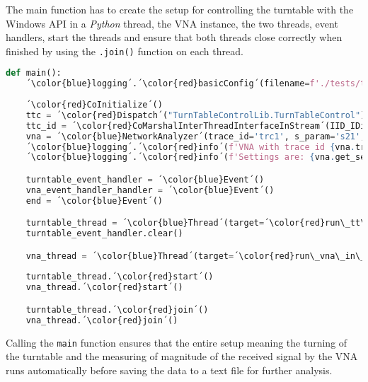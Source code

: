 The main function has to create the setup for controlling the turntable with the Windows API in a \textit{Python} thread, the VNA instance, the two threads, event handlers, start the threads and ensure that both threads close correctly when finished by using the \verb+.join()+ function on each thread. 
\begin{lstlisting}[language=Python, caption=Main function.]
def main():
    ´\color{blue}logging´.´\color{red}basicConfig´(filename=f'./tests/test-{time.strftime("%Y%m%d-%H%M")}-log.txt', filemode='a', format="%(asctime)s:%(name)s: %(message)s", level=logging.INFO, datefmt="%Y-%m-%d %H:%M:%S")
    
    ´\color{red}CoInitialize´()
    ttc = ´\color{red}Dispatch´("TurnTableControlLib.TurnTableControl")
    ttc_id = ´\color{red}CoMarshalInterThreadInterfaceInStream´(IID_IDispatch, ttc)
    vna = ´\color{blue}NetworkAnalyzer´(trace_id='trc1', s_param='s21', freq=5.65)
    ´\color{blue}logging´.´\color{red}info´(f'VNA with trace id {vna.trace_id} is created. Measuring {vna.s_param}.')
    ´\color{blue}logging´.´\color{red}info´(f'Settings are: {vna.get_settings()}')

    turntable_event_handler = ´\color{blue}Event´()
    vna_event_handler_handler = ´\color{blue}Event´()
    end = ´\color{blue}Event´()

    turntable_thread = ´\color{blue}Thread´(target=´\color{red}run\_tt\_in\_thread´, kwargs={'ttc_id': ttc_id, 'ttc': ttc, 'turntable_event_handler': turntable_event_handler, 'vna_event_handler': vna_event_handler_handler, 'end': end})
    turntable_event_handler.clear()

    vna_thread = ´\color{blue}Thread´(target=´\color{red}run\_vna\_in\_thread´, kwargs={'vna': vna, 'turntable_event_handler': turntable_event_handler, 'vna_event_handler': vna_event_handler_handler, 'end': end})
    
    turntable_thread.´\color{red}start´()
    vna_thread.´\color{red}start´()

    turntable_thread.´\color{red}join´()
    vna_thread.´\color{red}join´()
\end{lstlisting}
Calling the \verb+main+ function ensures that the entire setup meaning the turning of the turntable and the measuring of magnitude of the received signal by the VNA runs automatically before saving the data to a text file for further analysis.